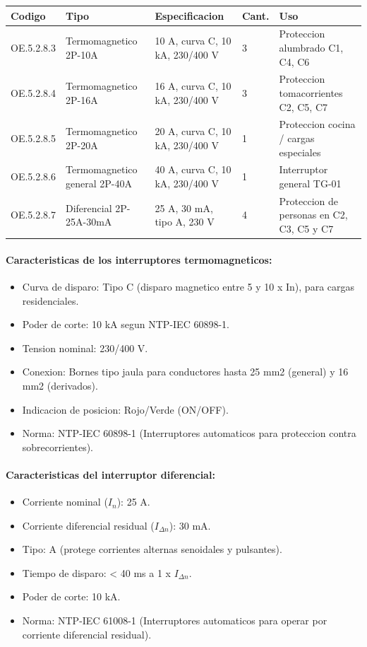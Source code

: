 \begin{longtable}{L{2.5cm} L{3.0cm} L{2.5cm} L{2.0cm} L{4.5cm}}
\toprule
\textbf{Codigo} & \textbf{Tipo} & \textbf{Especificacion} & \textbf{Cant.} & \textbf{Uso} \\
\midrule
OE.5.2.8.3 & Termomagnetico 2P-10A & 10 A, curva C, 10 kA, 230/400 V & 3 & Proteccion alumbrado C1, C4, C6 \\
OE.5.2.8.4 & Termomagnetico 2P-16A & 16 A, curva C, 10 kA, 230/400 V & 3 & Proteccion tomacorrientes C2, C5, C7 \\
OE.5.2.8.5 & Termomagnetico 2P-20A & 20 A, curva C, 10 kA, 230/400 V & 1 & Proteccion cocina / cargas especiales \\
OE.5.2.8.6 & Termomagnetico general 2P-40A & 40 A, curva C, 10 kA, 230/400 V & 1 & Interruptor general TG-01 \\
OE.5.2.8.7 & Diferencial 2P-25A-30mA & 25 A, 30 mA, tipo A, 230 V & 4 & Proteccion de personas en C2, C3, C5 y C7 \\
\bottomrule
\end{longtable}

\paragraph{Caracteristicas de los interruptores termomagneticos:}
\begin{itemize}[nosep]
  \item Curva de disparo: Tipo C (disparo magnetico entre 5 y 10 x In), para cargas residenciales.
  \item Poder de corte: 10 kA segun NTP-IEC 60898-1.
  \item Tension nominal: 230/400 V.
  \item Conexion: Bornes tipo jaula para conductores hasta 25 mm2 (general) y 16 mm2 (derivados).
  \item Indicacion de posicion: Rojo/Verde (ON/OFF).
  \item Norma: NTP-IEC 60898-1 (Interruptores automaticos para proteccion contra sobrecorrientes).
\end{itemize}

\paragraph{Caracteristicas del interruptor diferencial:}
\begin{itemize}[nosep]
  \item Corriente nominal ($I_n$): 25 A.
  \item Corriente diferencial residual ($I_{\Delta n}$): 30 mA.
  \item Tipo: A (protege corrientes alternas senoidales y pulsantes).
  \item Tiempo de disparo: < 40 ms a 1 x $I_{\Delta n}$.
  \item Poder de corte: 10 kA.
  \item Norma: NTP-IEC 61008-1 (Interruptores automaticos para operar por corriente diferencial residual).
\end{itemize}

